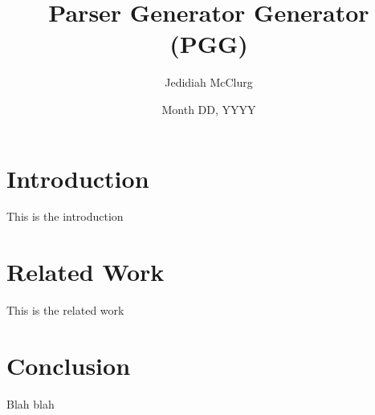 \documentclass[10pt]{article}
\title{Parser Generator Generator (PGG)}
\author{Jedidiah McClurg}
\date{Month DD, YYYY}
\begin{document}
\maketitle

\section{Introduction}
This is the introduction

\section{Related Work}
This is the related work \cite{raab1999controlled}

\section{Conclusion}
Blah blah



\end{document}
